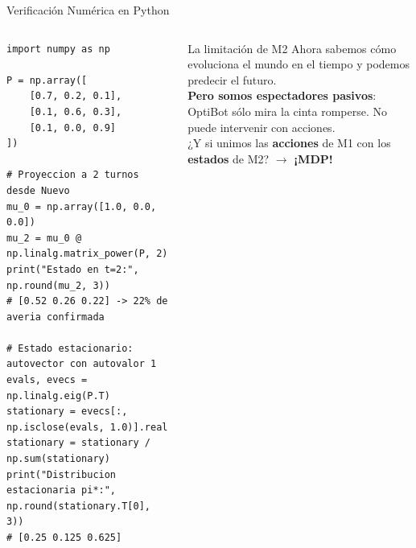 \begin{frame}[fragile]{Verificación Numérica en Python}
  \begin{columns}[T,onlytextwidth]
\begin{lstlisting}[style=rlcode]
import numpy as np

P = np.array([
    [0.7, 0.2, 0.1],
    [0.1, 0.6, 0.3],
    [0.1, 0.0, 0.9]
])

# Proyeccion a 2 turnos desde Nuevo
mu_0 = np.array([1.0, 0.0, 0.0])
mu_2 = mu_0 @ np.linalg.matrix_power(P, 2)
print("Estado en t=2:", np.round(mu_2, 3))
# [0.52 0.26 0.22] -> 22% de averia confirmada

# Estado estacionario: autovector con autovalor 1
evals, evecs = np.linalg.eig(P.T)
stationary = evecs[:, np.isclose(evals, 1.0)].real
stationary = stationary / np.sum(stationary)
print("Distribucion estacionaria pi*:", np.round(stationary.T[0], 3))
# [0.25 0.125 0.625]
\end{lstlisting}
      \begin{alertblock}{La limitación de M2}
        Ahora sabemos cómo evoluciona el mundo en el tiempo y podemos predecir el futuro.\\
        \vspace{0.2cm}
        \textbf{Pero somos espectadores pasivos}: OptiBot sólo mira la cinta romperse. No puede intervenir con acciones.\\
        \vspace{0.2cm}
        ¿Y si unimos las \textbf{acciones} de M1 con los \textbf{estados} de M2? $\to$ \textbf{¡MDP!}
      \end{alertblock}
  \end{columns}
\end{frame}
